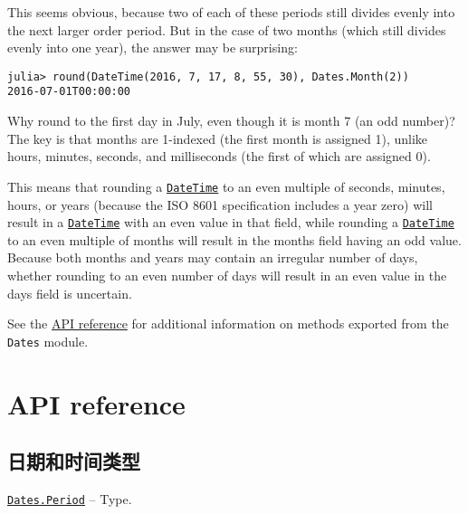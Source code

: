 This seems obvious, because two of each of these periods still divides evenly into the next larger order period. But in the case of two months (which still divides evenly into one year), the answer may be surprising:




\begin{verbatim}
julia> round(DateTime(2016, 7, 17, 8, 55, 30), Dates.Month(2))
2016-07-01T00:00:00
\end{verbatim}



Why round to the first day in July, even though it is month 7 (an odd number)? The key is that months are 1-indexed (the first month is assigned 1), unlike hours, minutes, seconds, and milliseconds (the first of which are assigned 0).



This means that rounding a \hyperlink{17572689933274889838}{\texttt{DateTime}} to an even multiple of seconds, minutes, hours, or years (because the ISO 8601 specification includes a year zero) will result in a \hyperlink{17572689933274889838}{\texttt{DateTime}} with an even value in that field, while rounding a \hyperlink{17572689933274889838}{\texttt{DateTime}} to an even multiple of months will result in the months field having an odd value. Because both months and years may contain an irregular number of days, whether rounding to an even number of days will result in an even value in the days field is uncertain.



See the \hyperlink{2504340439131318713}{API reference} for additional information on methods exported from the \texttt{Dates} module.



\hypertarget{14493106802066079367}{}


\chapter{API reference}



\hypertarget{16585603824908593588}{}


\section{日期和时间类型}


\hypertarget{17624028548543163266}{} 
\hyperlink{17624028548543163266}{\texttt{Dates.Period}}  -- {Type.}

